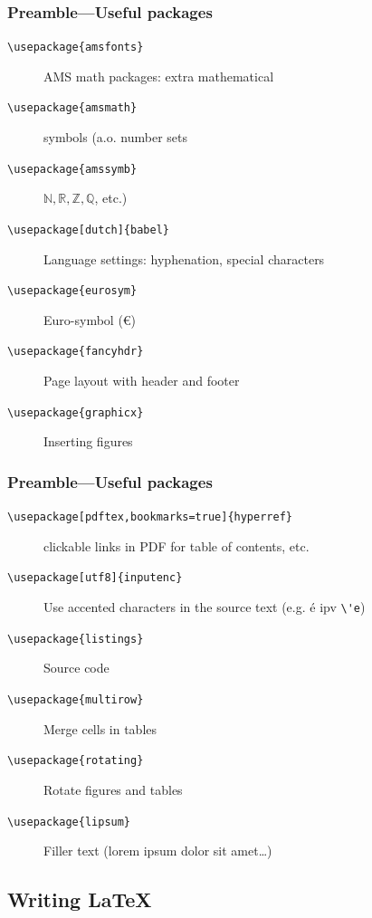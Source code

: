 \documentclass{beamer}
\begin{document}
\begin{frame}[fragile]
  \frametitle{Preamble---Useful packages}
  
  \begin{description}
  \item[\texttt{\textbackslash{}usepackage\{amsfonts\}}] AMS math packages: extra mathematical
  \item[\texttt{\textbackslash{}usepackage\{amsmath\}}] symbols (a.o. number sets
  \item[\texttt{\textbackslash{}usepackage\{amssymb\}}] $\mathbb{N}, \mathbb{R}, \mathbb{Z}, \mathbb{Q}$, etc.)
  \pause
  \item[\texttt{\textbackslash{}usepackage[dutch]\{babel\}}] Language settings: hyphenation, special characters
  \pause
  \item[\texttt{\textbackslash{}usepackage\{eurosym\}}] Euro-symbol (\euro)
  \pause
  \item[\texttt{\textbackslash{}usepackage\{fancyhdr\}}] Page layout with header and footer
  \pause
  \item[\texttt{\textbackslash{}usepackage\{graphicx\}}] Inserting figures
  \end{description}
\end{frame}

\begin{frame}[fragile]
  \frametitle{Preamble---Useful packages}
  
  \begin{description}
  \item[\texttt{\textbackslash{}usepackage[pdftex,bookmarks=true]\{hyperref\}}] clickable links in PDF for table of contents, etc. \pause
  \item[\texttt{\textbackslash{}usepackage[utf8]\{inputenc\}}] Use accented characters in the source text (e.g. é ipv \verb|\'e|) \pause
  \item[\texttt{\textbackslash{}usepackage\{listings\}}] Source code\pause
  \item[\texttt{\textbackslash{}usepackage\{multirow\}}] Merge cells in tables\pause
  \item[\texttt{\textbackslash{}usepackage\{rotating\}}] Rotate figures and tables \pause
  \item[\texttt{\textbackslash{}usepackage\{lipsum\}}] Filler text (lorem ipsum dolor sit amet\ldots)
  \end{description}
\end{frame}

\subsection{Writing {\LaTeX}}
\end{document}
